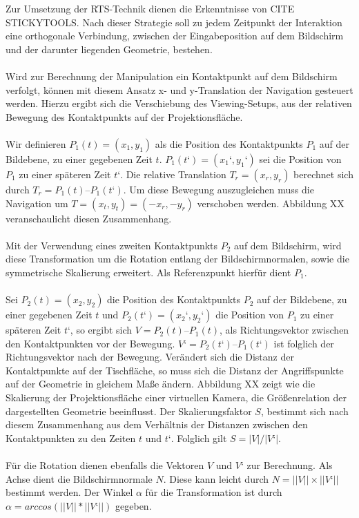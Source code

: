 Zur Umsetzung der RTS-Technik dienen die Erkenntnisse von CITE STICKYTOOLS. Nach dieser Strategie soll zu jedem Zeitpunkt der Interaktion eine orthogonale Verbindung, zwischen der Eingabeposition auf dem Bildschirm und der darunter liegenden Geometrie, bestehen.
\\\\
Wird zur Berechnung der Manipulation ein Kontaktpunkt auf dem Bildschirm verfolgt, können mit diesem Ansatz x- und y-Translation der Navigation gesteuert werden. Hierzu ergibt sich die Verschiebung des Viewing-Setups, aus der relativen Bewegung des Kontaktpunkts auf der Projektionsfläche. 
\\\\
Wir definieren $P_1(t) = (x_1, y_1)$ als die Position des Kontaktpunkts $P_1$ auf der Bildebene, zu einer gegebenen Zeit $t$. $P_1(t‘) = (x_1‘, y_1‘)$ sei die Position von $P_1$ zu einer späteren Zeit $t‘$. Die relative Translation $T_r = (x_r, y_r)$ berechnet sich durch $T_r = P_1(t) – P_1(t‘)$. Um diese Bewegung auszugleichen muss die Navigation um $T = (x_t, y_t) = (-x_r, -y_r)$ verschoben werden. Abbildung XX veranschaulicht diesen Zusammenhang.
\\\\
Mit der Verwendung eines zweiten Kontaktpunkts $P_2$ auf dem Bildschirm, wird diese Transformation um die Rotation entlang der Bildschirmnormalen, sowie die symmetrische Skalierung erweitert. Als Referenzpunkt hierfür dient $P_1$.
\\\\
Sei $P_2(t) = (x_2, y_2)$ die Position des Kontaktpunkts $P_2$ auf der Bildebene, zu einer gegebenen Zeit $t$ und $P_2(t‘) = (x_2‘, y_2‘)$ die Position von $P_1$ zu einer späteren Zeit $t‘$, so ergibt sich $V = P_2(t) – P_1(t)$, als Richtungsvektor zwischen den Kontaktpunkten vor der Bewegung. $V‘ = P_2(t‘) – P_1(t‘)$ ist folglich der Richtungsvektor nach der Bewegung. Verändert sich die Distanz der Kontaktpunkte auf der Tischfläche, so muss sich die Distanz der Angriffspunkte auf der Geometrie in gleichem Maße ändern. Abbildung XX zeigt wie die Skalierung der Projektionsfläche einer virtuellen Kamera, die Größenrelation der dargestellten Geometrie beeinflusst. Der Skalierungsfaktor $S$, bestimmt sich nach diesem Zusammenhang aus dem Verhältnis der Distanzen zwischen den Kontaktpunkten zu den Zeiten $t$ und $t‘$. Folglich gilt $S = |V| / |V‘|$. 
\\\\
Für die Rotation dienen ebenfalls die Vektoren $V$ und $V‘$ zur Berechnung. Als Achse dient die Bildschirmnormale $N$. Diese kann leicht durch $N = ||V|| \times ||V‘||$ bestimmt werden. Der Winkel $\alpha$ für die Transformation ist durch $\alpha = arccos(||V|| * ||V‘||)$ gegeben.



